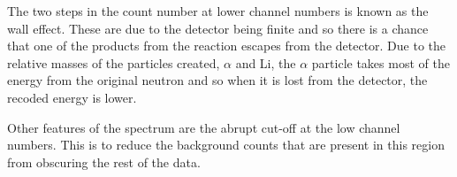 The two steps in the count number at lower channel numbers is known as the wall effect. These are due to the detector being finite and so there is a chance that one of the products from the reaction escapes from the detector. Due to the relative masses of the particles created, $\alpha$ and Li, the $\alpha$ particle takes most of the energy from the original neutron and so when it is lost from the detector, the recoded energy is lower.

Other features of the spectrum are the abrupt cut-off at the low channel numbers. This is to reduce the background counts that are present in this region from obscuring the rest of the data. 



